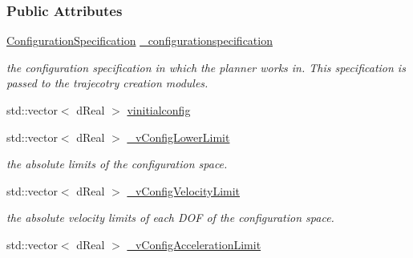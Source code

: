 \subsubsection*{Public Attributes}
\begin{DoxyCompactItemize}
\item 
\hypertarget{classOpenRAVE_1_1PlannerBase_1_1PlannerParameters_a24d5a3136b64a22a3385a9680843cbf5}{
\hyperlink{classOpenRAVE_1_1ConfigurationSpecification}{ConfigurationSpecification} \hyperlink{classOpenRAVE_1_1PlannerBase_1_1PlannerParameters_a24d5a3136b64a22a3385a9680843cbf5}{\_\-configurationspecification}}
\label{classOpenRAVE_1_1PlannerBase_1_1PlannerParameters_a24d5a3136b64a22a3385a9680843cbf5}

\begin{DoxyCompactList}\small\item\em the configuration specification in which the planner works in. This specification is passed to the trajecotry creation modules. \item\end{DoxyCompactList}\item 
std::vector$<$ dReal $>$ \hyperlink{classOpenRAVE_1_1PlannerBase_1_1PlannerParameters_aad3112dc0481a0b114f1154ee1d743a7}{vinitialconfig}
\item 
\hypertarget{classOpenRAVE_1_1PlannerBase_1_1PlannerParameters_a0a56912aa3223faae5d69840ef0edd14}{
std::vector$<$ dReal $>$ \hyperlink{classOpenRAVE_1_1PlannerBase_1_1PlannerParameters_a0a56912aa3223faae5d69840ef0edd14}{\_\-vConfigLowerLimit}}
\label{classOpenRAVE_1_1PlannerBase_1_1PlannerParameters_a0a56912aa3223faae5d69840ef0edd14}

\begin{DoxyCompactList}\small\item\em the absolute limits of the configuration space. \item\end{DoxyCompactList}\item 
\hypertarget{classOpenRAVE_1_1PlannerBase_1_1PlannerParameters_acfdac79592a4faa5e57c23b22c7a8954}{
std::vector$<$ dReal $>$ \hyperlink{classOpenRAVE_1_1PlannerBase_1_1PlannerParameters_acfdac79592a4faa5e57c23b22c7a8954}{\_\-vConfigVelocityLimit}}
\label{classOpenRAVE_1_1PlannerBase_1_1PlannerParameters_acfdac79592a4faa5e57c23b22c7a8954}

\begin{DoxyCompactList}\small\item\em the absolute velocity limits of each DOF of the configuration space. \item\end{DoxyCompactList}\item 
\hypertarget{classOpenRAVE_1_1PlannerBase_1_1PlannerParameters_a647a79190686baca1e50eef9887d0b70}{
std::vector$<$ dReal $>$ \hyperlink{classOpenRAVE_1_1PlannerBase_1_1PlannerParameters_a647a79190686baca1e50eef9887d0b70}{\_\-vConfigAccelerationLimit}}
\label{classOpenRAVE_1_1PlannerBase_1_1PlannerParameters_a647a79190686baca1e50eef9887d0b70}


\end{DoxyCompactItemize}
